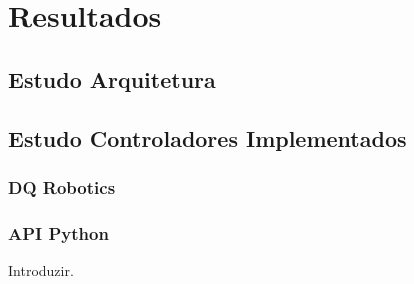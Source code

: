 \chapter{Resultados\label{chap:FundamentacaoMatematica}}


\section{Estudo Arquitetura}


\section{Estudo Controladores Implementados}

\subsection{DQ Robotics}

\subsection{API Python}

Introduzir.
